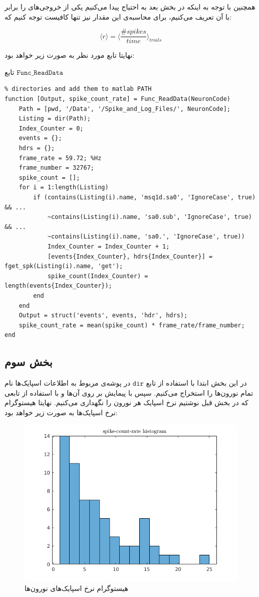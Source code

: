 \documentclass[12pt,onecolumn,a4paper,fleqn]{article}
\newcommand{\pf}[1]{$\mathtt{#1}$}
\begin{document}
		همچنین با توجه به اینکه در بخش بعد به  احتیاج پیدا می‌کنیم یکی از خروجی‌های  را برابر با آن تعریف می‌کنیم، برای محاسبه‌ی این مقدار نیز تنها کافیست توجه کنیم که:
		
		$$ \langle r \rangle = \langle \frac{\#spikes}{time} \rangle_{trials}$$
		
		 نهایتا تابع مورد نظر به صورت زیر خواهد بود:
		


\begin{code}{تابع \pf{Func\_ReadData}}
	\begin{latin}
		\begin{lstlisting}[style=Matlab-editor, tabsize=2]
% Recomend: select Data/ and MatlabFucntions/
% directories and add them to matlab PATH
function [Output, spike_count_rate] = Func_ReadData(NeuronCode)
	Path = [pwd, '/Data', '/Spike_and_Log_Files/', NeuronCode];
	Listing = dir(Path);
	Index_Counter = 0;
	events = {};
	hdrs = {};
	frame_rate = 59.72; %Hz
	frame_number = 32767;
	spike_count = [];
	for i = 1:length(Listing)
		if (contains(Listing(i).name, 'msq1d.sa0', 'IgnoreCase', true) && ...
			~contains(Listing(i).name, 'sa0.sub', 'IgnoreCase', true) && ...
			~contains(Listing(i).name, 'sa0.', 'IgnoreCase', true))
			Index_Counter = Index_Counter + 1;
			[events{Index_Counter}, hdrs{Index_Counter}] = fget_spk(Listing(i).name, 'get');
			spike_count(Index_Counter) = length(events{Index_Counter});
		end
	end
	Output = struct('events', events, 'hdr', hdrs);
	spike_count_rate = mean(spike_count) * frame_rate/frame_number;
end
		\end{lstlisting}
	\end{latin}
\end{code}

\subsection{بخش سوم}
در این بخش ابتدا با استفاده از تابع \pf{dir} در پوشه‌ی مربوط به اطلاعات اسپایک‌ها نام تمام نورون‌ها را استخراج می‌کنیم. سپس با پیمایش بر روی‌ آن‌ها و با استفاده از تابعی که در بخش قبل نوشتیم نرخ اسپایک هر نورون را نگهداری می‌کنیم. نهایتا هیستوگرام نرخ‌ اسپایک‌ها به صورت زیر خواهد بود:

	\begin{figure}[h]
	\centering
	\includegraphics[width=0.6\linewidth]{photos/fr-histogram.png}
	\caption{هیستوگرام نرخ اسپایک‌های نورون‌ها}
\end{figure}
\end{document}
